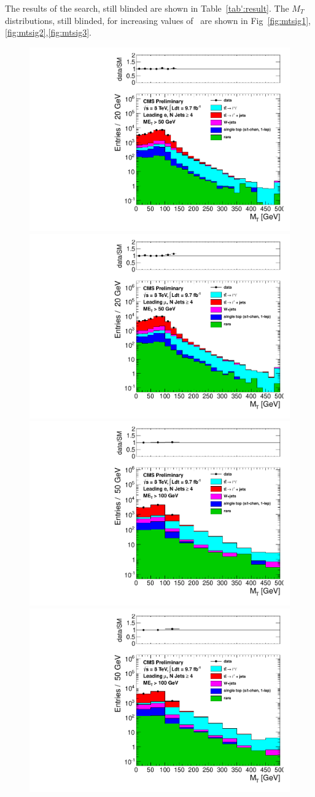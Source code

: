 
The results of the search, still blinded are shown in Table~\ref{tab':result}.
The $M_T$ distributions, still blinded, for increasing values of \met\
are shown in Fig~\ref{fig:mtsig1},\ref{fig:mtsig2},\ref{fig:mtsig3}.




\begin{figure}[hbt]
  \begin{center}
        \includegraphics[width=0.5\linewidth]{plots/mt_met50_ele.pdf}%
        \includegraphics[width=0.5\linewidth]{plots/mt_met50_muo.pdf}
        \includegraphics[width=0.5\linewidth]{plots/mt_met100_ele.pdf}%
        \includegraphics[width=0.5\linewidth]{plots/mt_met100_muo.pdf}

\end{center}
\end{figure}
